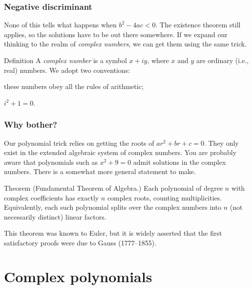 \begin{frame}

\frametitle{Negative discriminant}
\label{negativediscriminant}

None of this tells what happens when $b^2 - 4ac < 0$. The existence theorem still applies, so the solutions have to be out there somewhere. If we expand our thinking to the realm of \emph{complex numbers}, we can get them using the same trick.

 \begin{block}{Definition} 
 A \emph{complex number} is a symbol $x + iy$, where $x$ and $y$ are ordinary (i.e., real) numbers. We adopt two conventions:
  \begin{inparaenum}[(1)] 
  \item  these numbers obey all the rules of arithmetic;
  \item  $i^2 + 1 = 0$.
  \end{inparaenum} 
  \end{block} 

\end{frame}

\begin{frame}

\frametitle{Why bother?}
\label{whybother}

Our polynomial trick relies on getting the roots of $ar^2 + br + c = 0$. They only exist in the extended algebraic system of complex numbers. You are probably aware that polynomials such as $x^2 + 9 = 0$ admit solutions in the complex numbers. There is a somewhat more general statement to make.

 \begin{block}{Theorem} 
 (Fundamental Theorem of Algebra.) Each polynomial of degree $n$ with complex coefficients has exactly $n$ complex roots, counting multiplicities. Equivalently, each such polynomial splits over the complex numbers into $n$ (not necessarily distinct) linear factors.
  \end{block} 

This theorem was known to Euler, but it is widely asserted that the first satisfactory proofs were due to Gauss (1777--1855). 

\end{frame}

\section{Complex polynomials}
\label{complexpolynomials}

